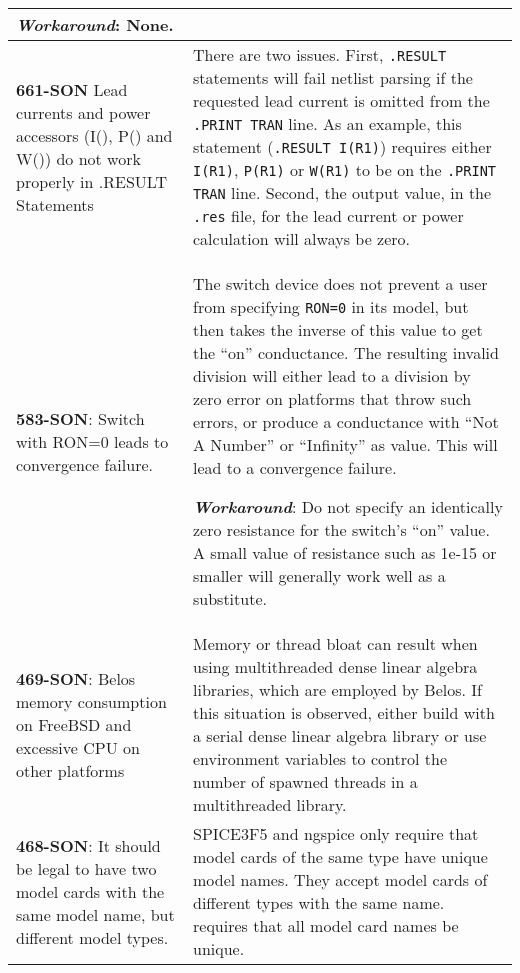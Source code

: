 {\begin{longtable}[h] {>{\raggedright\small}m{2in}|>{\raggedright\let\\\tabularnewline\small}m{3.5in}}
\textbf{\textit{Workaround}}: None. \\ \hline

\textbf{661-SON} Lead currents and power accessors (I(), P() and W()) do
not work properly in .RESULT Statements & There are two issues.
First, \texttt{.RESULT} statements will fail netlist parsing if the
requested lead current is omitted from the \texttt{.PRINT TRAN}
line.  As an example, this statement (\texttt{.RESULT I(R1)}) requires
either \texttt{I(R1)},
\texttt{P(R1)} or \texttt{W(R1)} to be on the \texttt{.PRINT TRAN} line.
Second, the output value, in the \texttt{.res} file, for the lead
current or power calculation will always be zero.
\\ \hline

\textbf{583-SON}: Switch with RON=0 leads to convergence failure. &
The switch device does not prevent a user from
specifying \texttt{RON=0} in its model, but then takes the inverse of
this value to get the ``on'' conductance.  The resulting invalid
division will either lead to a division by zero error on platforms
that throw such errors, or produce a conductance with ``Not A Number''
or ``Infinity'' as value.  This will lead to a convergence failure.

\textbf{\textit{Workaround}}: Do not specify an identically zero resistance
for the switch's ``on'' value.  A small value of resistance such as
1e-15 or smaller will generally work well as a substitute. \\ \hline


\textbf{469-SON}: Belos memory consumption on FreeBSD and excessive CPU on other platforms &
Memory or thread bloat can result when using multithreaded dense
linear algebra libraries, which are employed by Belos.  If this
situation is observed, either build
\Xyce{} with a serial dense linear algebra library or use environment variables
to control the number of spawned threads in a multithreaded library.
\\ \hline


\textbf{468-SON}: It should be legal to have two model cards with the same model name, but different model types. &
SPICE3F5 and ngspice only require that model cards of the same type
have unique model names. They accept model cards of different types
with the same name.  \Xyce{} requires that all model card names be
unique.
\\ \hline



\end{longtable}}
